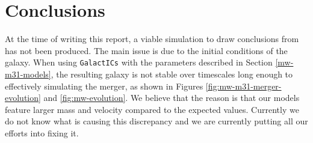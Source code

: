 \documentclass[a4paper,12pt, english]{article}
\begin{document}
\section{Conclusions}
\label{conclusions}
At the time of writing this report, a viable simulation to draw conclusions from has not been produced. The main issue is due to the initial conditions of the galaxy. When using \texttt{GalactICs} with the parameters described in Section \ref{mw-m31-models}, the resulting galaxy is not stable over timescales long enough to effectively simulating the merger, as shown in Figures \ref{fig:mw-m31-merger-evolution} and \ref{fig:mw-evolution}. We believe that the reason is that our models feature larger mass and velocity compared to the expected values. Currently we do not know what is causing this discrepancy and we are currently putting all our efforts into fixing it.\par
\smallskip
\end{document}
